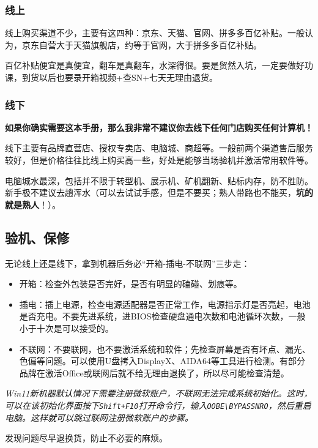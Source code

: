 \documentclass[../main.tex]{subfiles}
\begin{document}
\subsubsection{线上}

线上购买渠道不少，主要有这四种：京东、天猫、官网、拼多多百亿补贴。一般认为，京东自营大于天猫旗舰店，约等于官网，大于拼多多百亿补贴。

百亿补贴便宜是真便宜，翻车是真翻车，水深得很。要是贸然入坑，一定要做好功课，到货以后也要录开箱视频+查SN+七天无理由退货。

\subsubsection{线下}

\textbf{如果你确实需要这本手册，那么我非常不建议你去线下任何门店购买任何计算机！}

线下主要有品牌直营店、授权专卖店、电脑城、商超等。一般前两个渠道售后服务较好，但是价格往往比线上购买高一些，好处是能够当场验机并激活常用软件等。

电脑城水最深，包括并不限于转型机、展示机、矿机翻新、贴标内存，防不胜防。新手极不建议去趟浑水（可以去试试手感，但是不要买；熟人带路也不能买，\textbf{坑的就是熟人}！）。

\subsection{验机、保修}

无论线上还是线下，拿到机器后务必“开箱-插电-不联网”三步走：
\begin{itemize}
    \item 开箱：检查外包装是否完好，是否有明显的磕碰、划痕等。
    \item 插电：插上电源，检查电源适配器是否正常工作，电源指示灯是否亮起，电池是否充电。不要先进系统，进BIOS检查硬盘通电次数和电池循环次数，一般小于十次是可以接受的。
    \item 不联网：不要联网，也不要激活系统和软件；先检查屏幕是否有坏点、漏光、色偏等问题。可以使用U盘拷入DisplayX、AIDA64等工具进行检测。有部分品牌在激活Office或联网后就不给无理由退换了，所以尽可能检查清楚。
\end{itemize}

\textit{Win11新机器默认情况下需要注册微软账户，不联网无法完成系统初始化。这时，可以在该初始化界面按下\texttt{Shift+F10}打开命令行，输入\texttt{OOBE\textbackslash BYPASSNRO}，然后重启电脑。这样就可以跳过联网注册微软账户的步骤。}

发现问题尽早退换货，防止不必要的麻烦。
\end{document}
